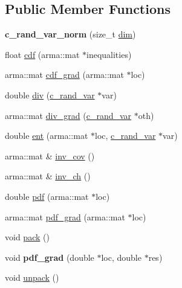 \subsection*{\-Public \-Member \-Functions}
\begin{DoxyCompactItemize}
\item 
\hypertarget{classdivopt_1_1c__rand__var__norm_a5482c2914b51e7838eebea1df9da5255}{{\bfseries c\-\_\-rand\-\_\-var\-\_\-norm} (size\-\_\-t \hyperlink{classdivopt_1_1c__rand__var_ad263b31b0e272d1c00a7368362ed19e4}{dim})}\label{classdivopt_1_1c__rand__var__norm_a5482c2914b51e7838eebea1df9da5255}

\item 
float \hyperlink{classdivopt_1_1c__rand__var__norm_ae97bbd872263013025d9083333c7c750}{cdf} (arma\-::mat $\ast$inequalities)
\item 
arma\-::mat \hyperlink{classdivopt_1_1c__rand__var__norm_af3cdc507ce57431b8e7adf31d9d43b25}{cdf\-\_\-grad} (arma\-::mat $\ast$loc)
\item 
double \hyperlink{classdivopt_1_1c__rand__var__norm_abdf1ec21f17eb4d67e48603550f3e134}{div} (\hyperlink{classdivopt_1_1c__rand__var}{c\-\_\-rand\-\_\-var} $\ast$var)
\item 
arma\-::mat \hyperlink{classdivopt_1_1c__rand__var__norm_af6c8d8d58ab0a0e9e18d09ea610aa346}{div\-\_\-grad} (\hyperlink{classdivopt_1_1c__rand__var}{c\-\_\-rand\-\_\-var} $\ast$oth)
\item 
double \hyperlink{classdivopt_1_1c__rand__var__norm_afdb198ee63254712f7c6aa0021a30ca9}{ent} (arma\-::mat $\ast$loc, \hyperlink{classdivopt_1_1c__rand__var}{c\-\_\-rand\-\_\-var} $\ast$var)
\item 
arma\-::mat \& \hyperlink{classdivopt_1_1c__rand__var__norm_a1c776a9aacc027a948e17099c8304395}{inv\-\_\-cov} ()
\item 
arma\-::mat \& \hyperlink{classdivopt_1_1c__rand__var__norm_a160d8b98203d30649a09ed4ffdea8bb9}{inv\-\_\-ch} ()
\item 
double \hyperlink{classdivopt_1_1c__rand__var__norm_a4b2bec9177f3e1ba8e7b3a212a6138b7}{pdf} (arma\-::mat $\ast$loc)
\item 
arma\-::mat \hyperlink{classdivopt_1_1c__rand__var__norm_ae6de55fcebe4d49d010e76943b53eb23}{pdf\-\_\-grad} (arma\-::mat $\ast$loc)
\item 
void \hyperlink{classdivopt_1_1c__rand__var__norm_aa132723e7b1639d39649042c84afe703}{pack} ()
\item 
\hypertarget{classdivopt_1_1c__rand__var__norm_a0d47dc64e53a79a05e8f3ce476ab8cb8}{void {\bfseries pdf\-\_\-grad} (double $\ast$loc, double $\ast$res)}\label{classdivopt_1_1c__rand__var__norm_a0d47dc64e53a79a05e8f3ce476ab8cb8}

\item 
void \hyperlink{classdivopt_1_1c__rand__var__norm_a74609f0002a3d05501ef3a3896938669}{unpack} ()
\end{DoxyCompactItemize}
